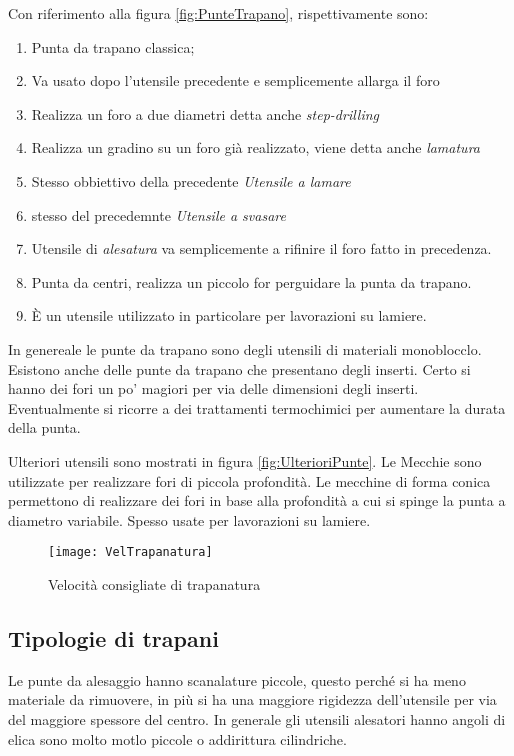 Con riferimento alla figura \ref{fig:PunteTrapano}, rispettivamente sono:
\begin{enumerate}
\item Punta da trapano classica;
\item Va usato dopo l'utensile precedente e semplicemente allarga il foro
\item Realizza un foro a due diametri detta anche \emph{step-drilling}
\item Realizza un gradino su un foro già realizzato, viene detta anche \emph{lamatura}
\item Stesso obbiettivo della precedente \emph{Utensile a lamare}
\item stesso del precedemnte \emph{Utensile a svasare}
\item Utensile di \emph{alesatura} va semplicemente a rifinire il foro fatto in precedenza.
\item Punta da centri, realizza un piccolo for perguidare la punta da trapano.
\item È un utensile utilizzato in particolare per lavorazioni su lamiere.
\end{enumerate}

In genereale le punte da trapano sono degli utensili di materiali monoblocclo. Esistono anche delle punte
da trapano che presentano degli inserti. Certo si hanno dei fori un po' magiori per via delle dimensioni
degli inserti.
Eventualmente si ricorre a dei trattamenti termochimici per aumentare la durata della punta.

Ulteriori utensili sono mostrati in figura \ref{fig:UlterioriPunte}.
Le Mecchie sono utilizzate per realizzare fori di piccola profondità.
Le mecchine di forma conica permettono di realizzare dei fori in base alla profondità a cui si spinge la punta
a diametro variabile. Spesso usate per lavorazioni su lamiere.

\begin{figure}
\centering
\texttt{[image: VelTrapanatura]}
\caption{Velocità consigliate di trapanatura}
\label{fig:Veltrapanatura}
\end{figure}

\subsection{Tipologie di trapani}

Le punte da alesaggio hanno scanalature piccole, questo perché si ha meno materiale da rimuovere, in più 
si ha una maggiore rigidezza dell'utensile per via del maggiore spessore del centro.
In generale gli utensili alesatori hanno angoli di elica sono molto motlo piccole o addirittura cilindriche.

